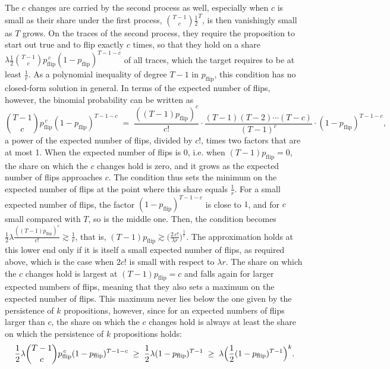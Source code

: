 \documentclass[titlepage,a4paper,11pt]{report}
\begin{document}
    The $c$ changes are carried by the second process as well, especially when $c$ is small as their share under the first process, $\binom{T-1}{c}\frac12^{T}$, is then vanishingly small as $T$ grows. On the traces of the second process, they require the proposition to start out true and to flip exactly $c$ times, so that they hold on a share $\lambda\frac12\binom{T-1}{c}p_{\text{flip}}^{\,c}(1-p_{\text{flip}})^{T-1-c}$ of all traces, which the target requires to be at least $\frac1r$. As a polynomial inequality of degree $T-1$ in $p_{\text{flip}}$, this condition has no closed-form solution in general. In terms of the expected number of flips, however, the binomial probability can be written as
    \begin{equation*}
        \binom{T-1}{c}p_{\text{flip}}^{\,c}(1-p_{\text{flip}})^{T-1-c}\;=\;\frac{((T-1)p_{\text{flip}})^c}{c!}\cdot\frac{(T-1)(T-2)\cdots(T-c)}{(T-1)^c}\cdot(1-p_{\text{flip}})^{T-1-c},
    \end{equation*}
    a power of the expected number of flips, divided by $c!$, times two factors that are at most 1. When the expected number of flips is $0$, i.e. when $(T-1)p_{\text{flip}}=0$, the share on which the $c$ changes hold is zero, and it grows as the expected number of flips approaches $c$. The condition thus sets the minimum on the expected number of flips at the point where this share equals $\frac1r$. For a small expected number of flips, the factor $(1-p_{\text{flip}})^{T-1-c}$ is close to $1$, and for $c$ small compared with $T$, so is the middle one. Then, the condition becomes $\frac12\lambda\frac{((T-1)p_{\text{flip}})^c}{c!}\gtrsim\frac1r$, that is, $(T-1)p_{\text{flip}}\gtrsim\bigl(\frac{2\,c!}{\lambda r}\bigr)^\frac1c$. The approximation holds at this lower end only if it is itself a small expected number of flips, as required above, which is the case when $2c!$ is small with respect to $\lambda r$. The share on which the $c$ changes hold is largest at $(T-1)p_{\text{flip}}=c$ and falls again for larger expected numbers of flips, meaning that they also sets a maximum on the expected number of flips. This maximum never lies below the one given by the persistence of $k$ propositions, however, since for an expected numbers of flips larger than $c$, the share on which the $c$ changes hold is always at least the share on which the persistence of $k$ propositions holds:
    \begin{equation*}
        \frac12\lambda\binom{T-1}{c}p_{\text{flip}}^{\,c}(1-p_{\text{flip}})^{T-1-c}\;\ge\;\frac12\lambda(1-p_{\text{flip}})^{T-1}\;\ge\;\lambda\Bigl(\frac12(1-p_{\text{flip}})^{T-1}\Bigr)^k .
    \end{equation*}
\end{document}
